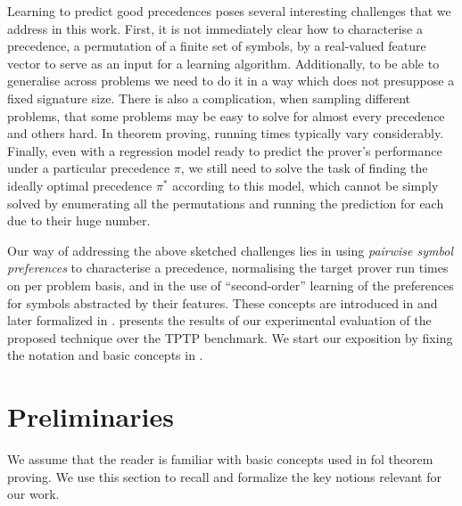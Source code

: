 Learning to predict good precedences poses several interesting challenges that we address in this work.
First, it is not immediately clear how to characterise a precedence, a permutation of a finite set of symbols,
by a real-valued feature vector to serve as an input for a learning algorithm. 
Additionally, to be able to generalise across problems
we need to do it in a way which does not presuppose a fixed signature size. 
There is also a complication, when sampling different problems,
that some problems may be easy to solve for almost every precedence and others hard.
In theorem proving, running times typically vary considerably.
Finally, even with a regression model ready to predict the prover's performance 
under a particular precedence $\pi$, we still need to solve the task of finding 
the ideally optimal precedence $\pi^*$ according to this model,
which cannot be simply solved by enumerating all the permutations and running the prediction for each
due to their huge number.

Our way of addressing the above sketched challenges lies in using \emph{pairwise symbol preferences}
to characterise a precedence, normalising the target prover run times on per problem basis,
and in the use of ``second-order'' learning of the preferences for symbols abstracted by their features.
These concepts are introduced in  and later formalized in .
 presents the results of our experimental evaluation of the proposed technique over the TPTP \cite{Sut17} benchmark.
We start our exposition by fixing the notation and basic concepts in .


\section{Preliminaries} \label{sect:prelim}


We assume that the reader is familiar with basic concepts used in \gls*{fol} theorem proving.
We use this section to recall and formalize the key notions relevant for our work.

